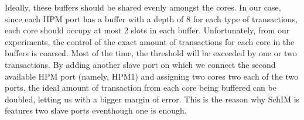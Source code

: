     Ideally, these buffers should be shared evenly amongst the cores. In our case, since each HPM port has a buffer with a depth of 8 for each type of transactions, each core should occupy at most 2 slots in each buffer. Unfortunately, from our experiments, the control of the exact amount of transactions for each core in the buffers is coarsed. Most of the time, the threshold will be exceeded by one or two transactions. By adding another slave port on which we connect the second available HPM port (namely, HPM1) and assigning two cores two each of the two ports, the ideal amount of transaction from each core being buffered can be doubled, letting us with a bigger margin of error. This is the reason why SchIM is features two slave ports eventhough one is enough.
